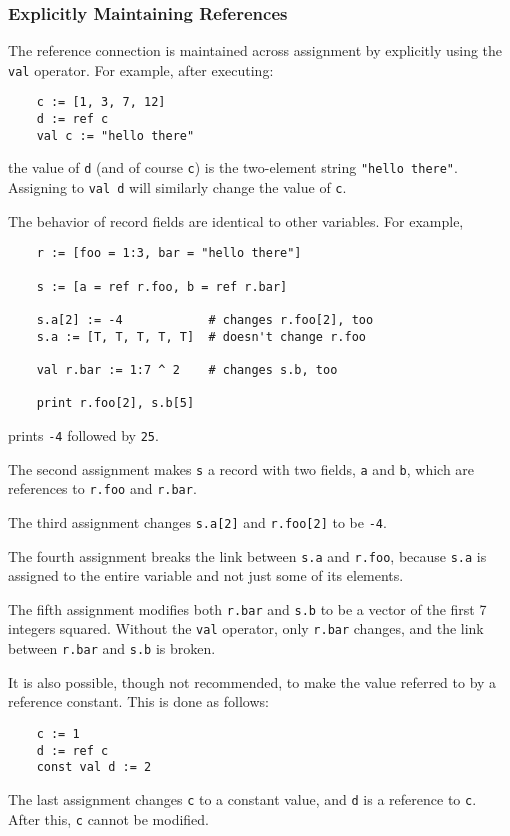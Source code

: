 \subsubsection{Explicitly Maintaining References}

The reference connection is maintained across assignment by
explicitly using the {\tt val} operator.  For
example, after executing:
\begin{verbatim}
    c := [1, 3, 7, 12]
    d := ref c
    val c := "hello there"
\end{verbatim}
the value of {\tt d} (and of course {\tt c}) is the two-element
string {\tt "hello there"}.  Assigning to {\tt val d} will similarly
change the value of {\tt c}.

The behavior of record fields are  identical to other variables. For
example,
\begin{verbatim}
    r := [foo = 1:3, bar = "hello there"]

    s := [a = ref r.foo, b = ref r.bar]

    s.a[2] := -4            # changes r.foo[2], too
    s.a := [T, T, T, T, T]  # doesn't change r.foo

    val r.bar := 1:7 ^ 2    # changes s.b, too

    print r.foo[2], s.b[5]
\end{verbatim}
prints {\tt -4} followed by {\tt 25}.

The second assignment makes {\tt s} a record with two fields, {\tt a} and
{\tt b}, which  are references to {\tt r.foo} and {\tt r.bar}.

The third assignment changes {\tt s.a[2]} and {\tt r.foo[2]} to be {\tt -4}.

The fourth assignment breaks the link between {\tt s.a} 
and {\tt r.foo},
because {\tt s.a} is assigned to the entire variable and not just
some of its elements.

The fifth assignment modifies both {\tt r.bar} and {\tt s.b} to be
a vector of the first 7 integers squared.  Without the {\tt val} operator, only
{\tt r.bar}  changes, and the link between {\tt r.bar}
and {\tt s.b} is broken.

It is also possible, though not recommended, to make the value referred to
by a reference constant. This is done as follows:
\begin{verbatim}
    c := 1
    d := ref c
    const val d := 2
\end{verbatim}
The last assignment changes {\tt c} to a constant value, and {\tt d} is a reference to
{\tt c}. After this, {\tt c} cannot be modified.


